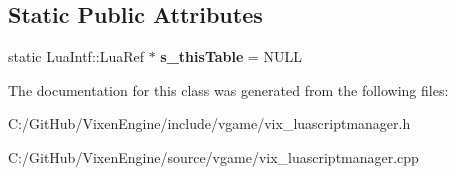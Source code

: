 \subsection*{Static Public Attributes}
\begin{DoxyCompactItemize}
\item 
\hypertarget{class_vixen_1_1_lua_script_manager_adff7ce02224dbc3a68aad8198962105d}{}static Lua\+Intf\+::\+Lua\+Ref $\ast$ {\bfseries s\+\_\+this\+Table} = N\+U\+L\+L\label{class_vixen_1_1_lua_script_manager_adff7ce02224dbc3a68aad8198962105d}

\end{DoxyCompactItemize}


The documentation for this class was generated from the following files\+:\begin{DoxyCompactItemize}
\item 
C\+:/\+Git\+Hub/\+Vixen\+Engine/include/vgame/vix\+\_\+luascriptmanager.\+h\item 
C\+:/\+Git\+Hub/\+Vixen\+Engine/source/vgame/vix\+\_\+luascriptmanager.\+cpp\end{DoxyCompactItemize}
